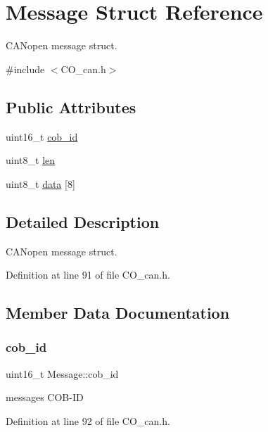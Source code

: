 \hypertarget{struct_message}{}\section{Message Struct Reference}
\label{struct_message}


C\+A\+Nopen message struct.  




{\ttfamily \#include $<$C\+O\+\_\+can.\+h$>$}

\subsection*{Public Attributes}
\begin{DoxyCompactItemize}
\item 
uint16\+\_\+t \mbox{\hyperlink{struct_message_a3e568dd631509c2b326f6b124f7de407}{cob\+\_\+id}}
\item 
uint8\+\_\+t \mbox{\hyperlink{struct_message_a0e2f37b0ed471c18c4d1a71a23981c23}{len}}
\item 
uint8\+\_\+t \mbox{\hyperlink{struct_message_a605b149e9987071433ebb36b43353526}{data}} \mbox{[}8\mbox{]}
\end{DoxyCompactItemize}


\subsection{Detailed Description}
C\+A\+Nopen message struct. 

Definition at line 91 of file C\+O\+\_\+can.\+h.



\subsection{Member Data Documentation}
\mbox{\label{struct_message_a3e568dd631509c2b326f6b124f7de407}} 
\subsubsection{\texorpdfstring{cob\+\_\+id}{cob\_id}}
{\footnotesize\ttfamily uint16\+\_\+t Message\+::cob\+\_\+id}

message\textquotesingle{}s C\+O\+B-\/\+ID 

Definition at line 92 of file C\+O\+\_\+can.\+h.

